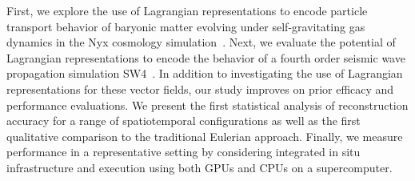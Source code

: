 First, we explore the use of Lagrangian representations to encode particle transport behavior of baryonic matter evolving under self-gravitating gas dynamics in the Nyx cosmology simulation~\cite{almgren2013nyx}.
%
Next, we evaluate the potential of Lagrangian representations to encode the behavior of a fourth order seismic wave propagation simulation SW4~\cite{petersson2015wave}. 
%
In addition to investigating the use of Lagrangian representations for these vector fields, our study improves on prior efficacy and performance evaluations.
%
We present the first statistical analysis of reconstruction accuracy for a range of spatiotemporal configurations as well as the first qualitative comparison to the traditional Eulerian approach. 
%
Finally, we measure performance in a representative setting by considering integrated in situ infrastructure and execution using both GPUs and CPUs on a supercomputer.

%
%
%
%
%
%

%
